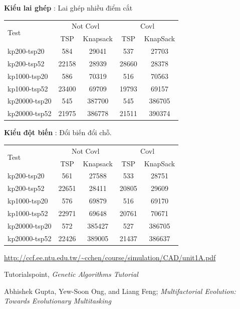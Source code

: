 \documentclass[a4paper,12pt]{report}
\begin{document}
\textbf{Kiểu lai ghép} : Lai ghép nhiều điểm cắt

\begin{longtable}{|l |c |c |c |c|}
\hline
\multirow{2}{*}{Test} 
& \multicolumn{2}{c|}{Not Covl} &\multicolumn{2}{|c|}{Covl} \\
\cline{2-5}
&TSP & Knapsack & TSP & KnapSack \\
\hline
kp200-tsp20  & 584&29041 &537 &27703 
\\ \hline
kp200-tsp52&22158 &28939&28660 &28378 \\ \hline
kp1000-tsp20 &586&70319&516&70563 \\ \hline
kp1000-tsp52 &23400&69709&19793&69157 \\ \hline
kp20000-tsp20 &545&387700&545 &386705 \\ \hline
kp20000-tsp52 &21975&386778&21511& 390374\\ \hline
\end{longtable}
\textbf{Kiểu đột biến} : Đổi biến đổi chỗ.

\begin{longtable}{|l |c |c |c |c|}
\hline
\multirow{2}{*}{Test} 
& \multicolumn{2}{c|}{Not Covl} &\multicolumn{2}{|c|}{Covl} \\
\cline{2-5}
&TSP & Knapsack & TSP & KnapSack \\
\hline
kp200-tsp20  & 561&27588 &533 &28751 
\\ \hline
kp200-tsp52&22651 &28411&20805 &29609 \\ \hline
kp1000-tsp20 &576&69879&516&69170 \\ \hline
kp1000-tsp52 &22971&69648&20761&70671 \\ \hline
kp20000-tsp20 &572&385427&527 &386705 \\ \hline

kp20000-tsp52 &22426 & 389005 & 21437 & 386637\\
\hline
\end{longtable}
\begin{thebibliography}{9}
 \url{http://ccf.ee.ntu.edu.tw/~cchen/course/simulation/CAD/unit1A.pdf}

 Tutorialspoint, \textit{Genetic Algorithms Tutorial}

 Abhishek Gupta, Yew-Soon Ong, and Liang Feng; \textit{Multifactorial Evolution: Towards Evolutionary Multitasking}

\end{thebibliography}
\end{document}
